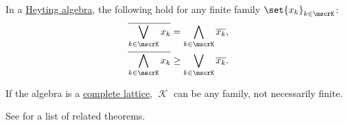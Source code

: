 \begin{theorem}\label{thm:de_morgans_laws_for_heyting_algebras}
  In a \hyperref[def:heyting_algebra]{Heyting algebra}, the following hold for any finite family \( \set{ x_k }_{k \in \mscrK} \):
  \begin{align}
    \oline{\bigvee_{k \in \mscrK} x_k}   &=    \bigwedge_{k \in \mscrK} \oline{x_k}, \label{eq:thm:de_morgans_laws_for_heyting_algebras/complement_of_join} \\
    \oline{\bigwedge_{k \in \mscrK} x_k} &\geq \bigvee_{k \in \mscrK} \oline{x_k}.   \label{eq:thm:de_morgans_laws_for_heyting_algebras/complement_of_meet}
  \end{align}

  If the algebra is a \hyperref[def:complete_lattice]{complete lattice}, \( \mscrK \) can be any family, not necessarily finite.
\end{theorem}
\begin{comments}
  \item See  for a list of related theorems.
\end{comments}
